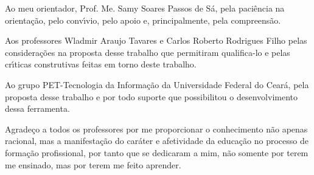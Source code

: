 Ao meu orientador, Prof. Me. Samy Soares Passos de S\'{a}, pela paci\^{e}ncia na orienta\c{c}\~{a}o, pelo conv\'{\i}vio, pelo apoio e, principalmente, pela compreens\~{a}o.

Aos professores Wladmir Araujo Tavares e Carlos Roberto Rodrigues Filho pelas considera\c{c}\~{o}es na proposta desse trabalho que permitiram qualifica-lo e pelas cr\'{\i}ticas construtivas feitas em torno deste trabalho.

Ao grupo PET-Tecnologia da Informa\c{c}\~{a}o da Universidade Federal do Cear\'{a}, pela proposta desse trabalho e por todo suporte que possibilitou o desenvolvimento dessa ferramenta.

Agrade\c{c}o a todos os professores por me proporcionar o conhecimento n\~{a}o apenas racional, mas a manifesta\c{c}\~{a}o do car\'{a}ter e afetividade da educa\c{c}\~{a}o no processo de forma\c{c}\~{a}o profissional, por tanto que se dedicaram a mim, n\~{a}o somente por terem me ensinado, mas por terem me feito aprender. 


